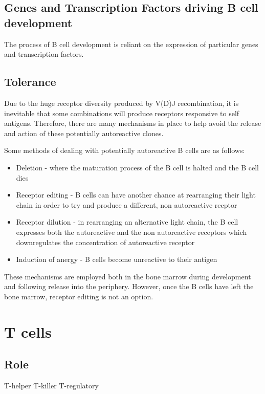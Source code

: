 \subsection{Genes and Transcription Factors driving B cell development}

The process of B cell development is reliant on the expression of particular genes and transcription factors.




\subsection{Tolerance}

Due to the huge receptor diversity produced by V(D)J recombination, it is inevitable that some combinations will produce receptors responsive to self antigens.
Therefore, there are many mechanisms in place to help avoid the release and action of these potentially autoreactive clones.

Some methods of dealing with potentially autoreactive B cells are as follows:
\begin{itemize}
\item Deletion - where the maturation process of the B cell is halted and the B cell dies \citep{Cornall1995}
\item Receptor editing - B cells can have another chance at rearranging their light chain in order to try and produce a different, non autoreactive recptor \citep{Orduno2009, Gay1993}
\item Receptor dilution - in rearranging an alternative light chain, the B cell expresses both the autoreactive and the non autoreactive receptors which downregulates the concentration of autoreactive receptor \citep{Gay1993, Orduno2009}
\item Induction of anergy - B cells become unreactive to their antigen \citep{Orduno2009}
\end{itemize}

These mechanisms are employed both in the bone marrow during development and following release into the periphery.
However, once the B cells have left the bone marrow, receptor editing is not an option.



\section{T cells}
\subsection{Role}
T-helper
T-killer
T-regulatory

